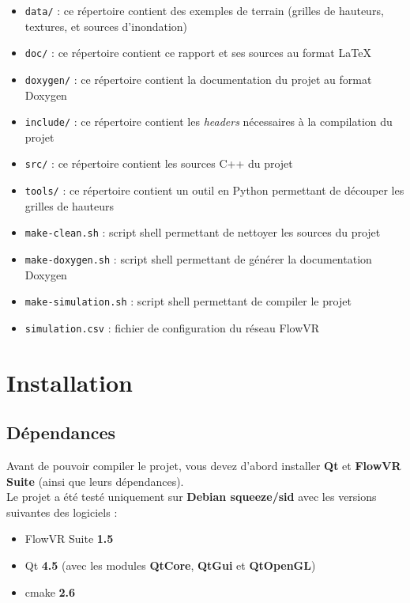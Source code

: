 \documentclass[a4paper, 12pt]{article}
\begin{document}
\begin{itemize}
\item \texttt{data/} : ce répertoire contient des exemples de terrain (grilles
de hauteurs, textures, et sources d'inondation)
\item \texttt{doc/} : ce répertoire contient ce rapport et ses sources au format
{\LaTeX}
\item \texttt{doxygen/} : ce répertoire contient la documentation du projet au
format Doxygen
\item \texttt{include/} : ce répertoire contient les \textit{headers}
nécessaires à la compilation du projet
\item \texttt{src/} : ce répertoire contient les sources C++ du projet
\item \texttt{tools/} : ce répertoire contient un outil en Python permettant de
découper les grilles de hauteurs
\item \texttt{make-clean.sh} : script shell permettant de nettoyer les sources
du projet
\item \texttt{make-doxygen.sh} : script shell permettant de générer la
documentation Doxygen
\item \texttt{make-simulation.sh} : script shell permettant de compiler le
projet
\item \texttt{simulation.csv} : fichier de configuration du réseau
FlowVR
\end{itemize}

\section{Installation}

\subsection{Dépendances}

Avant de pouvoir compiler le projet, vous devez d'abord installer \textbf{Qt} et
\textbf{FlowVR Suite} (ainsi que leurs dépendances). \\

Le projet a été testé uniquement sur \textbf{Debian squeeze/sid} avec les
versions suivantes des logiciels :

\begin{itemize}
\item FlowVR Suite \textbf{1.5}
\item Qt \textbf{4.5} (avec les modules \textbf{QtCore}, \textbf{QtGui} et
\textbf{QtOpenGL})
\item cmake \textbf{2.6}
\end{itemize}
\end{document}
